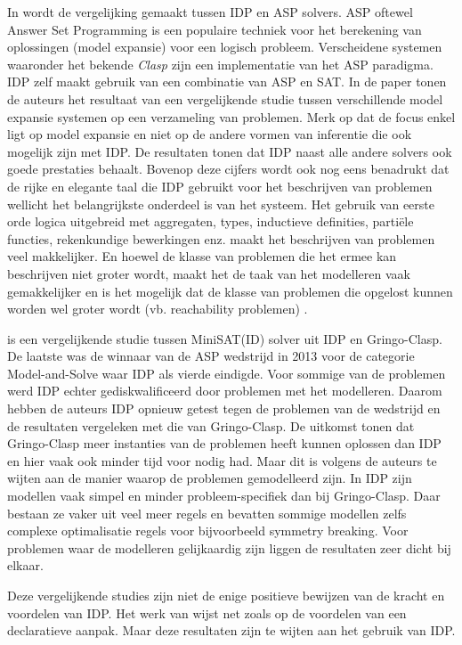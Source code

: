 In \citep{wittocx2008idp} wordt de vergelijking gemaakt tussen IDP en ASP solvers. ASP oftewel Answer Set Programming is een populaire techniek voor het berekening van oplossingen (model expansie) voor een logisch probleem. Verscheidene systemen waaronder het bekende \textit{Clasp} zijn een implementatie van het ASP paradigma. IDP zelf maakt gebruik van een combinatie van ASP en SAT. In de paper tonen de auteurs het resultaat van een vergelijkende studie tussen verschillende model expansie systemen op een verzameling van problemen. Merk op dat de focus enkel ligt op model expansie en niet op de andere vormen van inferentie die ook mogelijk zijn met IDP. De resultaten tonen dat IDP naast alle andere solvers ook goede prestaties behaalt. Bovenop deze cijfers wordt ook nog eens benadrukt dat de rijke en elegante taal die IDP gebruikt voor het beschrijven van problemen wellicht het belangrijkste onderdeel is van het systeem. Het gebruik van eerste orde logica uitgebreid met aggregaten, types, inductieve definities, parti\"{e}le functies, rekenkundige bewerkingen enz. maakt het beschrijven van problemen veel makkelijker. En hoewel de klasse van problemen die het ermee kan beschrijven niet groter wordt, maakt het de taak van het modelleren vaak gemakkelijker en is het mogelijk dat de klasse van problemen die opgelost kunnen worden wel groter wordt (vb. reachability problemen) \cite{denecker2008building}.

\citep{de2014minisat} is een vergelijkende studie tussen MiniSAT(ID) solver uit IDP en Gringo-Clasp. De laatste was de winnaar van de ASP wedstrijd in 2013 voor de categorie Model-and-Solve waar IDP als vierde eindigde. Voor sommige van de problemen werd IDP echter gediskwalificeerd door problemen met het modelleren. Daarom hebben de auteurs IDP opnieuw getest tegen de problemen van de wedstrijd en de resultaten vergeleken met die van Gringo-Clasp. De uitkomst tonen dat Gringo-Clasp meer instanties van de problemen heeft kunnen oplossen dan IDP en hier vaak ook minder tijd voor nodig had. Maar dit is volgens de auteurs te wijten aan de manier waarop de problemen gemodelleerd zijn. In IDP zijn modellen vaak simpel en minder probleem-specifiek dan bij Gringo-Clasp. Daar bestaan ze vaker uit veel meer regels en bevatten sommige modellen zelfs complexe optimalisatie regels voor bijvoorbeeld symmetry breaking. Voor problemen waar de modelleren gelijkaardig zijn liggen de resultaten zeer dicht bij elkaar. 

Deze vergelijkende studies zijn niet de enige positieve bewijzen van de kracht en voordelen van IDP. Het werk van \citep{vlaeminck2009logical} wijst net zoals \cite{gelle1996interactive} op de voordelen van een declaratieve aanpak. Maar deze resultaten zijn te wijten aan het gebruik van IDP. 

